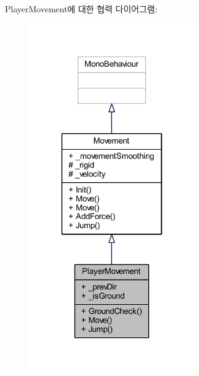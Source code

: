 Player\+Movement에 대한 협력 다이어그램\+:\nopagebreak
\begin{figure}[H]
\begin{center}
\leavevmode
\includegraphics[width=202pt]{d5/df4/class_player_movement__coll__graph}
\end{center}
\end{figure}
